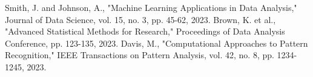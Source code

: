 \documentclass[conference]{IEEEtran}
\begin{document}
\begin{thebibliography}{99}
 Smith, J. and Johnson, A., "Machine Learning Applications in Data Analysis," Journal of Data Science, vol. 15, no. 3, pp. 45-62, 2023.
 Brown, K. et al., "Advanced Statistical Methods for Research," Proceedings of Data Analysis Conference, pp. 123-135, 2023.
 Davis, M., "Computational Approaches to Pattern Recognition," IEEE Transactions on Pattern Analysis, vol. 42, no. 8, pp. 1234-1245, 2023.
\end{thebibliography}
\end{document}
